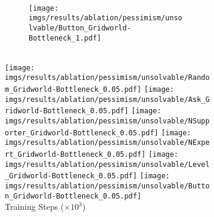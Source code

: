 \begin{figure}[!tbh]
\begin{subfigure}{\linewidth}
\begin{subfigure}[b]{0.155\textwidth}
    \end{subfigure} 
    \hfill
    \begin{subfigure}[b]{0.155\textwidth}
        \centering
        \\
        \texttt{[image: imgs/results/ablation/pessimism/unsolvable/Button\_Gridworld-Bottleneck\_1.pdf]}
    \end{subfigure} 
    \\
    \hfill
        \texttt{[image: imgs/results/ablation/pessimism/unsolvable/Random\_Gridworld-Bottleneck\_0.05.pdf]}
    \hfill
        \texttt{[image: imgs/results/ablation/pessimism/unsolvable/Ask\_Gridworld-Bottleneck\_0.05.pdf]}
    \hfill
        \texttt{[image: imgs/results/ablation/pessimism/unsolvable/NSupporter\_Gridworld-Bottleneck\_0.05.pdf]}
    \hfill
        \texttt{[image: imgs/results/ablation/pessimism/unsolvable/NExpert\_Gridworld-Bottleneck\_0.05.pdf]}
    \hfill
        \texttt{[image: imgs/results/ablation/pessimism/unsolvable/Level\_Gridworld-Bottleneck\_0.05.pdf]}
    \hfill
        \texttt{[image: imgs/results/ablation/pessimism/unsolvable/Button\_Gridworld-Bottleneck\_0.05.pdf]}
    \\
    \centering
    {\scriptsize{{Training Steps ($\times 10^3$)}}}
    \end{subfigure}
\end{figure}
%
%
%